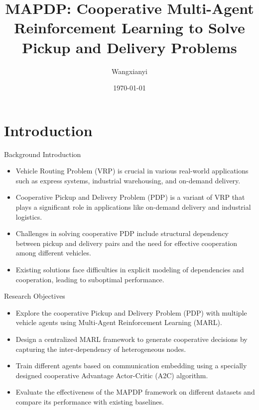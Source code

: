 \documentclass{beamer}
\author{Wangxianyi}
\title{MAPDP: \newline Cooperative Multi-Agent Reinforcement Learning to Solve Pickup and
Delivery Problems}
\institute{LZU}
\date{\today}
\begin{document}
\kaishu
\begin{frame}
	\titlepage
\end{frame}

\begin{frame}
	\tableofcontents[sectionstyle=show,subsectionstyle=show/shaded/hide,subsubsectionstyle=show/shaded/hide]
\end{frame}


\section{Introduction}

\begin{frame}{Background Introduction}
	\begin{itemize}
		\item Vehicle Routing Problem (VRP) is crucial in various real-world applications such as express systems, industrial warehousing, and on-demand delivery.
		\item Cooperative Pickup and Delivery Problem (PDP) is a variant of VRP that plays a significant role in applications like on-demand delivery and industrial logistics.
		\item Challenges in solving cooperative PDP include structural dependency between pickup and delivery pairs and the need for effective cooperation among different vehicles.
		\item Existing solutions face difficulties in explicit modeling of dependencies and cooperation, leading to suboptimal performance.
	\end{itemize}
\end{frame}

\begin{frame}{Research Objectives}
	\begin{itemize}
		\item Explore the cooperative Pickup and Delivery Problem (PDP) with multiple vehicle agents using Multi-Agent Reinforcement Learning (MARL).
		\item Design a centralized MARL framework to generate cooperative decisions by capturing the inter-dependency of heterogeneous nodes.
		\item Train different agents based on communication embedding using a specially designed cooperative Advantage Actor-Critic (A2C) algorithm.
		\item Evaluate the effectiveness of the MAPDP framework on different datasets and compare its performance with existing baselines.
	\end{itemize}
\end{frame}
\end{document}
